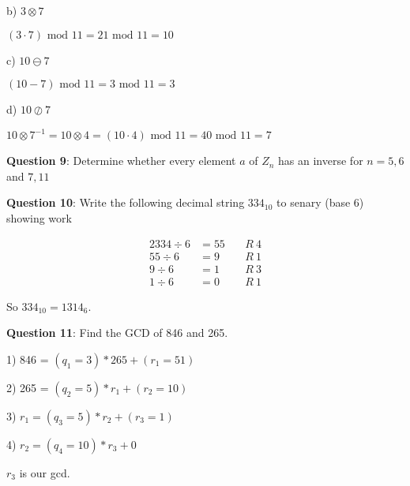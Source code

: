 \documentclass{article} %
\newcommand{\question}[2][]{\begin{flushleft}
        \textbf{Question #1}: #2

\end{flushleft}}
\begin{document}
    b) $3 \otimes 7$

    \tabto{0.9cm}$(3 \cdot 7)\text{ mod } 11 = 21 \text{ mod } 11 = 10$

    c) $10 \ominus 7$

    \tabto{0.9cm}$(10 - 7)\text{ mod } 11 = 3 \text{ mod } 11 = 3$

    d) $10 \oslash 7$
    
    \tabto{0.95cm}$10 \otimes 7^{-1}= 10 \otimes 4 = (10 \cdot 4)\text{ mod } 11 = 40 \text{ mod } 11 = 7$

    \question[9]{Determine whether every element $a$ of $Z_n$ has an inverse for $n = 5, 6$ and $ 7, 11$}

    \question[10]{Write the following decimal string $334_{10}$ to senary (base 6) showing work}
    \begin{alignat*}{2}
        334 \div 6 &= 55\ &&R\ 4\\
        55  \div 6 &= 9   &&R\ 1\\
        9   \div 6 &= 1   &&R\ 3\\
        1   \div 6 &= 0   &&R\ 1
    \end{alignat*}

    So $334_{10} = 1314_6$.

    \question[11]{Find the GCD of 846 and 265.}

    1) 846 = $(q_1 = 3) * 265 + (r_1 = 51)$

    2) 265 = $(q_2 = 5) * r_1 + (r_2 = 10)$

    3) $r_1 = (q_3 = 5) * r_2 + (r_3 = 1)$

    4) $r_2 = (q_4 = 10) * r_3 + 0$

    $r_3$ is our gcd.

    
\end{document}
